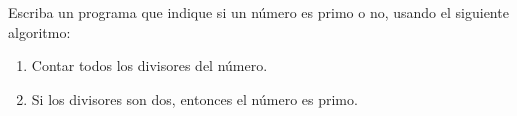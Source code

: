 Escriba un programa que indique
si un número es primo o no,
usando el siguiente algoritmo:
\begin{enumerate}
  \item Contar todos los divisores del número.
  \item Si los divisores son dos,
    entonces el número es primo.
\end{enumerate}

\begin{minipage}[t]{.21\textwidth}
  
\end{minipage}
\quad
\begin{minipage}[t]{.21\textwidth}
  
\end{minipage}
\quad
\begin{minipage}[t]{.21\textwidth}
  
\end{minipage}
\quad
\begin{minipage}[t]{.21\textwidth}
  
\end{minipage}

